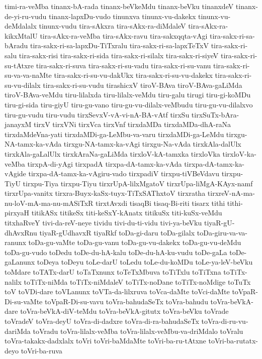 {timi-ra-veMba
tinanx-bA-rada
tinanx-beVkeMdu
tinanx-beVku
tinanxdeV
tinanx-de-yi-ru-vudu
tinanx-lapxDu-vudo
tinunxva
tinunx-vu-dakekx
tinunx-vu-deMdalalx
tinunx-vudu
tira-sAkxra
tira-sAkx-ra-diMdaleV
tira-sAkx-ra-kikxMtalU
tira-sAkx-ra-veMba
tira-sAkx-ravu
tira-sakxqqta-vAgi
tira-sakx-ri-sa-bAradu
tira-sakx-ri-sa-lapxDu-TiTxralu
tira-sakx-ri-sa-lapxTeTxV
tira-sakx-ri-salu
tira-sakx-risi
tira-sakx-ri-sida
tira-sakx-ri-silalx
tira-sakx-ri-siyeV
tira-sakx-ri-su-tAtxre
tira-sakx-ri-suva
tira-sakx-ri-su-vadu
tira-sakx-ri-su-vanu
tira-sakx-ri-su-va-va-naMte
tira-sakx-ri-su-vu-dakUkx
tira-sakx-ri-su-vu-dakekx
tira-sakx-ri-su-vu-dilalx
tira-sakx-ri-su-vudu
tirashicxV
tiroV-BAva
tiroV-BAva-gaLiMda
tiroV-BAva-veMdu
tiru-lilalxda
tiru-lilalx-veMdu
tiru-galu
tirugi
tiru-gi-koMDu
tiru-gi-sida
tiru-giyU
tiru-gu-vano
tiru-gu-vu-dilalx-veMbudu
tiru-gu-vu-dilalxvo
tiru-gu-vudu
tiru-vudu
tirxSevxV-vA-vi-nA-BA-vAtf
tirxSu
tirxSuTx-bAra-janayxM
tirxV
tirxVNi
tirxVca
tirxVnf
tirxdaMDa
tirxdaMDa-dhA-raNa
tirxdaMdeVna-yati
tirxdaMDi-ga-LeMbu-va-varu
tirxdaMDi-ga-LeMdu
tirxgu-NA-tamx-ka-vAda
tirxgu-NA-tamx-ka-vAgi
tirxgu-Na-vAda
tirxkAla-dalUlx
tirxkAla-gaLalUlx
tirxkAraNa-gaLiMda
tirxloV-kA-tamxka
tirxloVka
tirxloV-ka-veMba
tirxpA-di-yAgi
tirxpadA
tirxpa-dA-tamx-ka-vAda
tirxpa-dA-tamx-ka-vAgide
tirxpa-dA-tamx-ka-vAgiru-vado
tirxpadiV
tirxpu-tiVBeVdavu
tirxpu-TiyU
tirxpu-Tiya
tirxpu-Tiyu
tirxrUpA-lilxMgatoV
tirxrUpa-liMgA-KAyx-namf
tirxrUpa-vanitx
tirxra-Buyx-kaSx-tuyx-TiTxSAThxtoV
tirxratha
tirxreV-nA-ma-nu-loV-mA-ma-nu-mASiTxR
tirxtAvxdi
tisaqBi
tisaq-Bi-riti
tisarx
tithi
tithi-pirxyaH
titikASx
titikeSx
titi-keSxY-kAnatx
titikuSx
titi-kuSx-veMdu
titxhaRveY
tivi-da-reV-neye
tividu
tivi-du-ti-vidu
tivi-ya-beVku
tiyaR-gU-dhAvxRnu
tiyaR-gUdhavxR
tiyaRkf
toDa-gi-daru
toDa-gilalx
toDa-giru-va-va-ranunx
toDa-gu-vaMte
toDa-gu-vanu
toDa-gu-vu-dakekx
toDa-gu-vu-deMdu
toDa-gu-vudo
toDedu
toDe-du-hA-kalu
toDe-du-hA-ku-vudu
toDe-gaLa
toDe-gaLanunx
toDeya
toDeyu
toLe-darU
toLedu
toLe-du-koMDu
toLe-ya-leV-beVku
toMdare
toTATx-darU
toTaTxnunx
toTeTxMbuva
toTiTxlu
toTiTxna
toTiTx-nalilx
toTiTx-niMda
toTiTx-niMdaleV
toTiTx-noDane
toTiTx-noMdige
toTuTx
toV
toVDi-dare
toVLanunx
toVTa-da-lilxruva
toVca-daMte
toVci-daMte
toVpaR-Di-su-vaMte
toVpaR-Di-su-vavu
toVra-bahudaSeTx
toVra-bahudu
toVra-beVkA-dare
toVra-beVkA-diV-teMdu
toVra-beVkA-gitutx
toVra-beVku
toVrade
toVradeV
toVra-deyU
toVra-di-dadxre
toVra-di-ra-bahudaSeTx
toVra-di-ru-vu-dariMda
toVradu
toVra-lilalx-veMba
toVra-lilalx-veMbu-va-driMdalo
toVralu
toVra-takakx-dadxlalx
toVri
toVri-baMdaMte
toVri-ba-ru-tAtxne
toVri-ba-rutatx-deyo
toVri-ba-ruva
}
